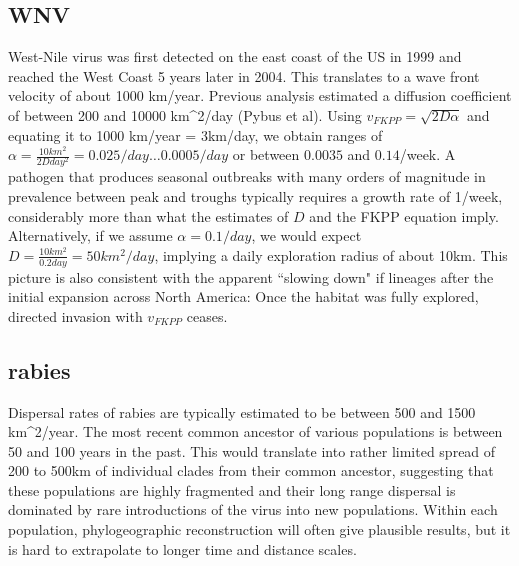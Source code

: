 \documentclass[aps,rmp, onecolumn]{revtex4}
\begin{document}
\subsection{WNV}
West-Nile virus was first detected on the east coast of the US in 1999 and reached the West Coast 5 years later in 2004. This translates to a wave front velocity of about 1000 km/year. Previous analysis estimated a diffusion coefficient of between 200 and 10000 km^2/day (Pybus et al). Using $v_{FKPP} = \sqrt{2D\alpha}$ and equating it to 1000 km/year = 3km/day, we obtain ranges of $\alpha=\frac{10 km^2}{2D day^2} = 0.025/day \ldots 0.0005/day$ or between $0.0035$ and $0.14$/week.
A pathogen that produces seasonal outbreaks with many orders of magnitude in prevalence between peak and troughs typically requires a growth rate of 1/week, considerably more than what the estimates of $D$ and the FKPP equation imply.
Alternatively, if we assume $\alpha = 0.1/day$, we would expect $D = \frac{10 km^2}{0.2 day} = 50 km^2/day$, implying a daily exploration radius of about 10km.
This picture is also consistent with the apparent ``slowing down" if lineages after the initial expansion across North America: Once the habitat was fully explored, directed invasion with $v_{FKPP}$ ceases.

\subsection{rabies}
Dispersal rates of rabies are typically estimated to be between 500 and 1500 km^2/year.
The most recent common ancestor of various populations is between 50 and 100 years in the past.
This would translate into rather limited spread of 200 to 500km of individual clades from their common ancestor, suggesting that these populations are highly fragmented and their long range dispersal is dominated by rare introductions of the virus into new populations.
Within each population, phylogeographic reconstruction will often give plausible results, but it is hard to extrapolate to longer time and distance scales.
\end{document}
